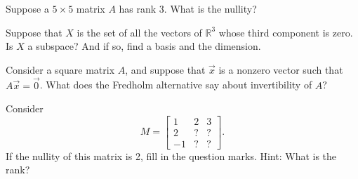 \begin{exercise}
Suppose a $5 \times 5$ matrix $A$ has rank 3.  What is the nullity?
\end{exercise}

\begin{exercise}
Suppose that $X$ is the set of all the vectors of ${\mathbb{R}}^3$ whose
third component is zero.  Is $X$ a subspace?  And if so, find a basis
and the dimension.
\end{exercise}

\begin{exercise}
Consider a square matrix $A$, and suppose that $\vec{x}$ is a nonzero
vector such that $A \vec{x} = \vec{0}$.  What does the Fredholm alternative
say about invertibility of $A$?
\end{exercise}

\begin{exercise}
Consider
\begin{equation*}
M =
\begin{bmatrix}
1 & 2 & 3 \\
2 & ? & ? \\
-1 & ? & ?
\end{bmatrix} .
\end{equation*}
If the nullity of this matrix is 2, fill in the question marks.  Hint: What
is the rank?
\end{exercise}

\setcounter{exercise}{100}

